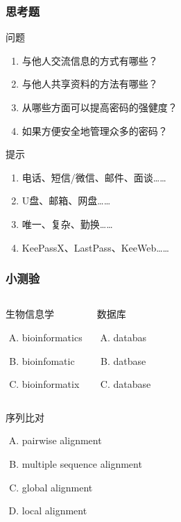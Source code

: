 \begin{frame}
  \frametitle{思考题}
  \begin{block}{问题}
  \begin{enumerate}[<+-|alert@+>]
    \item 与他人交流信息的方式有哪些？
    \item 与他人共享资料的方法有哪些？
    \item 从哪些方面可以提高密码的强健度？
    \item 如果方便安全地管理众多的密码？
  \end{enumerate}
  \end{block}
  \pause
  \begin{block}{提示}
    \begin{enumerate}
      \item 电话、短信/微信、邮件、面谈……
      \item U盘、邮箱、网盘……
      \item 唯一、复杂、勤换……
      \item KeePassX、LastPass、KeeWeb……
    \end{enumerate}
  \end{block}
\end{frame}

\begin{frame}
  \frametitle{小测验}
  \begin{columns}
    \begin{block}{生物信息学}
      \begin{enumerate}[(A)]
        \item bioinformatics
        \item bioinfomatic
        \item bioinformatix
      \end{enumerate}
    \end{block}
    \pause
    \begin{block}{数据库}
      \begin{enumerate}[(A)]
        \item databas
        \item datbase
        \item database
      \end{enumerate}
    \end{block}
  \end{columns}
  \pause
  \begin{columns}
    \begin{block}{序列比对}
      \begin{enumerate}[(A)]
        \item pairwise alignment
        \item multiple sequence alignment
        \item global alignment
        \item local alignment
      \end{enumerate}
    \end{block}
  \end{columns}
\end{frame}
